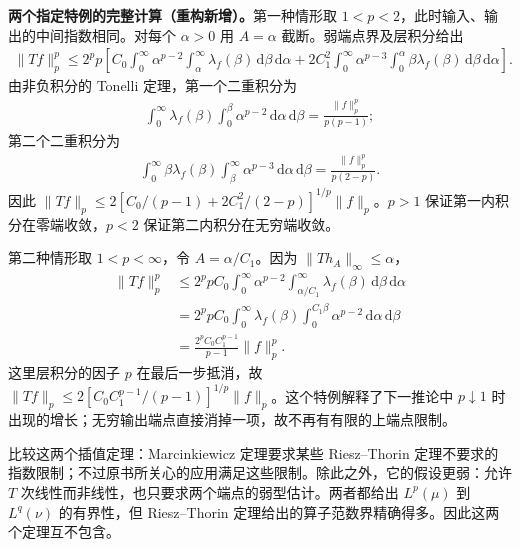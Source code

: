 \documentclass[../../main.tex]{subfiles}
\begin{document}
\begin{remark}
\textbf{两个指定特例的完整计算（重构新增）。}第一种情形取 $1<p<2$，此时输入、输出的中间指数相同。对每个 $\alpha>0$ 用 $A=\alpha$ 截断。弱端点界及层积分给出
\begin{align*}
\|Tf\|_p^p
\leqslant2^pp\left[
C_0\int_0^\infty\alpha^{p-2}\int_\alpha^\infty\lambda_f(\beta)\,\mathrm d\beta\,\mathrm d\alpha
+2C_1^2\int_0^\infty\alpha^{p-3}\int_0^\alpha\beta\lambda_f(\beta)\,\mathrm d\beta\,\mathrm d\alpha
\right].
\end{align*}
由非负积分的 Tonelli 定理，第一个二重积分为
\begin{align*}
\int_0^\infty\lambda_f(\beta)\int_0^\beta\alpha^{p-2}\,\mathrm d\alpha\,\mathrm d\beta
=\frac{\|f\|_p^p}{p(p-1)};
\end{align*}
第二个二重积分为
\begin{align*}
\int_0^\infty\beta\lambda_f(\beta)\int_\beta^\infty\alpha^{p-3}\,\mathrm d\alpha\,\mathrm d\beta
=\frac{\|f\|_p^p}{p(2-p)}.
\end{align*}
因此 $\|Tf\|_p\leqslant2[C_0/(p-1)+2C_1^2/(2-p)]^{1/p}\|f\|_p$。$p>1$ 保证第一内积分在零端收敛，$p<2$ 保证第二内积分在无穷端收敛。

第二种情形取 $1<p<\infty$，令 $A=\alpha/C_1$。因为 $\|Th_A\|_\infty\leqslant\alpha$，
\begin{align*}
\|Tf\|_p^p
&\leqslant2^ppC_0\int_0^\infty\alpha^{p-2}
\int_{\alpha/C_1}^\infty\lambda_f(\beta)\,\mathrm d\beta\,\mathrm d\alpha\\
&=2^ppC_0\int_0^\infty\lambda_f(\beta)
\int_0^{C_1\beta}\alpha^{p-2}\,\mathrm d\alpha\,\mathrm d\beta\\
&=\frac{2^pC_0C_1^{p-1}}{p-1}\|f\|_p^p.
\end{align*}
这里层积分的因子 $p$ 在最后一步抵消，故 $\|Tf\|_p\leqslant2[C_0C_1^{p-1}/(p-1)]^{1/p}\|f\|_p$。这个特例解释了下一推论中 $p\downarrow1$ 时出现的增长；无穷输出端点直接消掉一项，故不再有有限的上端点限制。
\end{remark}
比较这两个插值定理：Marcinkiewicz 定理要求某些 Riesz–Thorin 定理不要求的指数限制；不过原书所关心的应用满足这些限制。除此之外，它的假设更弱：允许 $T$ 次线性而非线性，也只要求两个端点的弱型估计。两者都给出 $L^p(\mu)$ 到 $L^q(\nu)$ 的有界性，但 Riesz–Thorin 定理给出的算子范数界精确得多。因此这两个定理互不包含。
\end{document}
